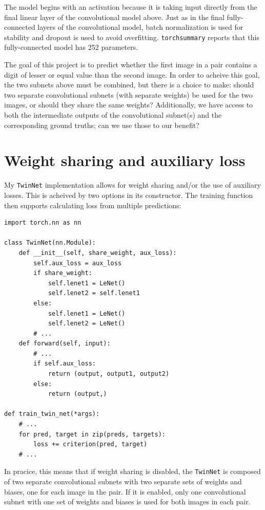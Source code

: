 \documentclass[prl, article, twocolumn]{revtex4-1}
\begin{document}
The model begins with an activation because it is taking input directly from the final linear layer of the convolutional model above. Just as in the final fully-connected layers of the convolutional model, batch normalization is used for stability and dropout is used to avoid overfitting. \texttt{torchsummary} reports that this fully-connected model has 252 parameters.

The goal of this project is to predict whether the first image in a pair contains a digit of lesser or equal value than the second image. In order to acheive this goal, the two subnets above must be combined, but there is a choice to make: should two separate convolutional subnets (with separate weights) be used for the two images, or should they share the same weights? Additionally, we have access to both the intermediate outputs of the convolutional subnet(s) and the corresponding ground truths; can we use those to our benefit? 

\section{Weight sharing and auxiliary loss}
My \texttt{TwinNet} implementation allows for weight sharing and/or the use of auxiliary losses. This is acheived by two options in its constructor. The training function then supports calculating loss from multiple predictions:

\begin{verbatim}
import torch.nn as nn

class TwinNet(nn.Module):
    def __init__(self, share_weight, aux_loss):
        self.aux_loss = aux_loss
        if share_weight:
            self.lenet1 = LeNet()
            self.lenet2 = self.lenet1
        else:
            self.lenet1 = LeNet()
            self.lenet2 = LeNet()
        # ...
    def forward(self, input):
        # ...
        if self.aux_loss:
            return (output, output1, output2)
        else:
            return (output,)

def train_twin_net(*args):
    # ...
    for pred, target in zip(preds, targets):
        loss += criterion(pred, target)
    # ...
\end{verbatim}

In pracice, this means that if weight sharing is disabled, the \texttt{TwinNet} is composed of two separate convolutional subnets with two separate sets of weights and biases, one for each image in the pair. If it is enabled, only one convolutional subnet with one set of weights and biases is used for both images in each pair.
\end{document}
